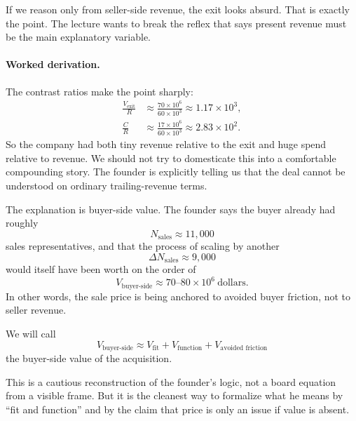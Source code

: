 If we reason only from seller-side revenue, the exit looks absurd. That is exactly the point. The lecture wants to break the reflex that says present revenue must be the main explanatory variable.

\paragraph{Worked derivation.} The contrast ratios make the point sharply:
\begin{align}
\frac{V_{\text{exit}}}{R}
&\approx
\frac{70 \times 10^6}{60 \times 10^3}
\approx 1.17 \times 10^3,\\
\frac{C}{R}
&\approx
\frac{17 \times 10^6}{60 \times 10^3}
\approx 2.83 \times 10^2.
\end{align}
So the company had both tiny revenue relative to the exit and huge spend relative to revenue. We should not try to domesticate this into a comfortable compounding story. The founder is explicitly telling us that the deal cannot be understood on ordinary trailing-revenue terms.

The explanation is buyer-side value. The founder says the buyer already had roughly
\begin{equation}
N_{\text{sales}} \approx 11{,}000
\end{equation}
sales representatives, and that the process of scaling by another
\begin{equation}
\Delta N_{\text{sales}} \approx 9{,}000
\end{equation}
would itself have been worth on the order of
\begin{equation}
V_{\text{buyer-side}} \approx 70\text{--}80 \times 10^6 \ \text{dollars}.
\end{equation}
In other words, the sale price is being anchored to avoided buyer friction, not to seller revenue.

\begin{definition}
We will call
\begin{equation}
V_{\text{buyer-side}}
\approx
V_{\text{fit}} + V_{\text{function}} + V_{\text{avoided friction}}
\end{equation}
the buyer-side value of the acquisition.
\end{definition}

\begin{remark}
This is a cautious reconstruction of the founder's logic, not a board equation from a visible frame. But it is the cleanest way to formalize what he means by ``fit and function'' and by the claim that price is only an issue if value is absent.
\end{remark}

